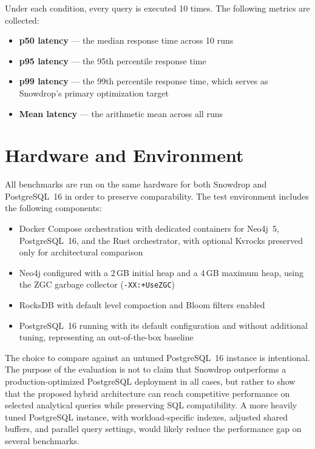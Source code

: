 Under each condition, every query is executed 10 times. The following metrics are collected:

\begin{itemize}
  \item \textbf{p50 latency} --- the median response time across 10 runs
  \item \textbf{p95 latency} --- the 95th percentile response time
  \item \textbf{p99 latency} --- the 99th percentile response time, which serves as Snowdrop’s primary optimization target
  \item \textbf{Mean latency} --- the arithmetic mean across all runs
\end{itemize}

\section{Hardware and Environment}

All benchmarks are run on the same hardware for both Snowdrop and PostgreSQL~16 in order to preserve comparability. The test environment includes the following components:

\begin{itemize}
  \item Docker Compose orchestration with dedicated containers for Neo4j~5, PostgreSQL~16, and the Rust orchestrator, with optional Kvrocks preserved only for architectural comparison
  \item Neo4j configured with a 2\,GB initial heap and a 4\,GB maximum heap, using the ZGC garbage collector (\texttt{-XX:+UseZGC})
  \item RocksDB with default level compaction and Bloom filters enabled
  \item PostgreSQL~16 running with its default configuration and without additional tuning, representing an out-of-the-box baseline
\end{itemize}

The choice to compare against an untuned PostgreSQL~16 instance is intentional. The purpose of the evaluation is not to claim that Snowdrop outperforms a production-optimized PostgreSQL deployment in all cases, but rather to show that the proposed hybrid architecture can reach competitive performance on selected analytical queries while preserving SQL compatibility. A more heavily tuned PostgreSQL instance, with workload-specific indexes, adjusted shared buffers, and parallel query settings, would likely reduce the performance gap on several benchmarks.

